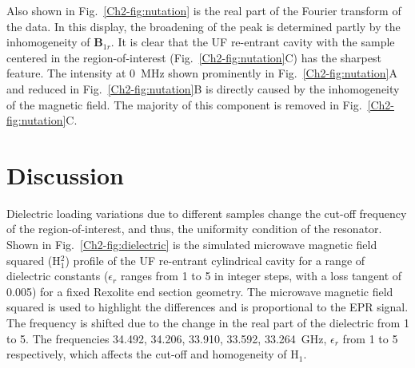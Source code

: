 Also shown in Fig.~\ref{Ch2-fig:nutation} is the real part of the Fourier transform of the data. In this display, the broadening of the peak is determined partly by the inhomogeneity of $\mathbf{B}_{1r}$. \cite{pulsejeschke} It is clear that the UF re-entrant \cylTE{} cavity with the sample centered in the region-of-interest (Fig.~\ref{Ch2-fig:nutation}C) has the sharpest feature. The intensity at 0~MHz shown prominently in Fig.~\ref{Ch2-fig:nutation}A and reduced in Fig.~\ref{Ch2-fig:nutation}B is directly caused by the inhomogeneity of the magnetic field. The majority of this component is removed in Fig.~\ref{Ch2-fig:nutation}C. 

\section{Discussion}

Dielectric loading variations due to different samples change the cut-off frequency of the region-of-interest, and thus, the uniformity condition of the resonator. Shown in Fig.~\ref{Ch2-fig:dielectric} is the simulated microwave magnetic field squared (H$^2_1$) profile of the UF re-entrant cylindrical \cylTE{} cavity for a range of dielectric constants ($\epsilon_r$ ranges from 1 to 5 in integer steps, with a loss tangent of 0.005) for a fixed Rexolite end section geometry. The microwave magnetic field squared is used to highlight the differences and is proportional to the EPR signal. The frequency is shifted due to the change in the real part of the dielectric from 1 to 5. The frequencies  34.492, 34.206, 33.910, 33.592, 33.264~GHz, $\epsilon_r$ from 1 to 5 respectively, which affects the cut-off and homogeneity of H$_1$. 

